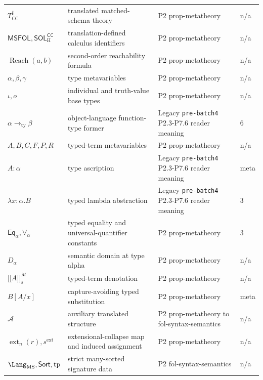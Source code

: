 \begin{longtable}{@{}p{}p{}p{}p{}@{}}
\(T_{\mathsf{CC}}^\sharp\) & translated matched-schema theory & P2 prop-\allowbreak{}metatheory & n/a \\
\(\mathsf{MSFOL},\allowbreak \mathsf{SOL}_{\mathrm H}^{\mathsf{CC}}\) & translation-defined calculus identifiers & P2 prop-\allowbreak{}metatheory & n/a \\
\(\operatorname{Reach}(a,\allowbreak b)\) & second-order reachability formula & P2 prop-\allowbreak{}metatheory & n/a \\
\(\alpha,\allowbreak \beta,\allowbreak \gamma\) & type metavariables & P2 prop-\allowbreak{}metatheory & n/a \\
\(\iota,\allowbreak o\) & individual and truth-value base types & P2 prop-\allowbreak{}metatheory & n/a \\
\(\alpha\to_{\mathrm{ty}}\beta\) & object-language function-type former & Legacy \texttt{pre-\allowbreak{}batch4} P2.\allowbreak{}3-\allowbreak{}P7.\allowbreak{}6 reader meaning & 6 \\
\(A,\allowbreak B,\allowbreak C,\allowbreak F,\allowbreak P,\allowbreak R\) & typed-term metavariables & P2 prop-\allowbreak{}metatheory & n/a \\
\(A:\alpha\) & type ascription & Legacy \texttt{pre-\allowbreak{}batch4} P2.\allowbreak{}3-\allowbreak{}P7.\allowbreak{}6 reader meaning & meta \\
\(\lambda x{:}\alpha.B\) & typed lambda abstraction & Legacy \texttt{pre-\allowbreak{}batch4} P2.\allowbreak{}3-\allowbreak{}P7.\allowbreak{}6 reader meaning & 3 \\
\(\mathsf{Eq}_{\alpha},\allowbreak \forall_{\alpha}\) & typed equality and universal-quantifier constants & P2 prop-\allowbreak{}metatheory & 3 \\
\(D_\alpha\) & semantic domain at type alpha & P2 prop-\allowbreak{}metatheory & n/a \\
\(\lbrack\!\lbrack A\rbrack\!\rbrack_s^{\mathcal M}\) & typed-term denotation & P2 prop-\allowbreak{}metatheory & n/a \\
\(B[A/x]\) & capture-avoiding typed substitution & P2 prop-\allowbreak{}metatheory & meta \\
\(\mathcal A\) & auxiliary translated structure & P2 prop-\allowbreak{}metatheory to fol-\allowbreak{}syntax-\allowbreak{}semantics & n/a \\
\(\operatorname{ext}_n(r),\allowbreak s^{\mathrm{ext}}\) & extensional-collapse map and induced assignment & P2 prop-\allowbreak{}metatheory & n/a \\
\(\Lang_{\mathrm{MS}},\allowbreak \mathsf{Sort},\allowbreak \operatorname{tp}\) & strict many-sorted signature data & P2 fol-\allowbreak{}syntax-\allowbreak{}semantics & n/a \\

\end{longtable}
